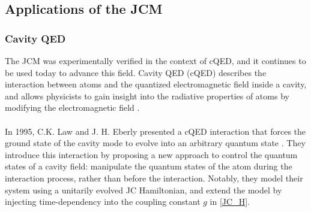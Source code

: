 \documentclass[12pt,a4paper]{article}
\begin{document}
\subsection{Applications of the JCM}

\subsubsection{Cavity QED}

The JCM was experimentally verified in the context of cQED, and it continues to be used today to advance this field. Cavity QED (cQED) describes the interaction between atoms and the quantized electromagnetic field inside a cavity, and allows physicists to gain insight into the radiative properties of atoms by modifying the electromagnetic field \cite{General2024-JC_overview}.\\
\\
In 1995, C.K. Law and J. H. Eberly presented a cQED interaction that forces the ground state of the cavity mode to evolve into an arbitrary quantum state \cite{Context1996-CQED_JCM}. They introduce this interaction by proposing a new approach to control the quantum states of a cavity field: manipulate the quantum states of the atom during the interaction process, rather than before the interaction. Notably, they model their system using a unitarily evolved JC Hamiltonian, and extend the model by injecting time-dependency into the coupling constant $g$ in \eqref{JC_H}.\\
\\
\end{document}
